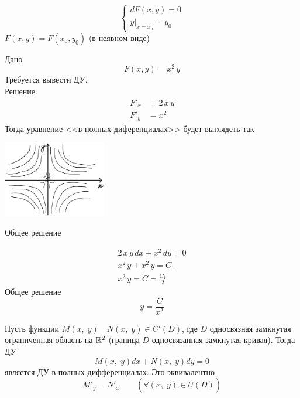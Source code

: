 \begin{Note}
    \[
        \begin{cases}
            dF(x,y)=0\\
            y|_{x=x_0}=y_0
        \end{cases}
    \]
    $F(x,y)=F(x_0,y_0)$ (в неявном виде)\\
\end{Note}

\begin{Example}
    Дано
    \[
        F(x,y)=x^2\,y 
    \]
    Требуется вывести ДУ.\\
    Решение.
    \begin{align*}
        F'_x &=2\,x\,y\\
        F'_y &= x^2
    \end{align*}
    Тогда уравнение <<в полных диференциалах>> будет выглядеть так
    \begin{floatingfigure}[l]{50mm}
        \noindent
        \hfil
        \includegraphics[width=45mm]{2_5_1.png}
        \caption{Общее решение}
        \hfil
    \end{floatingfigure}
    \begin{gather*}
        2\,x\,y\,dx+x^2\,dy = 0\\
        x^2\,y + x^2\,y = C_1\\
        x^2\,y = C = \frac{C_1}{2}
    \end{gather*}
    Общее решение
    \[
        y=\frac{C}{x^2}
    \]
\end{Example}

\begin{Th}
    Пусть функции $M(x,\; y) \quad N(x,\; y) \in C'(D)$, где $D$ односвязная замкнутая ограниченная область на $\mathbb{R}^2$ (граница $D$ односвязанная замкнутая кривая). Тогда ДУ 
    \[
        M(x,\; y)dx + N(x,\; y)dy = 0
    \] 
    является ДУ в полных дифференциалах. Это эквивалентно 
    \[
        M'_y = N'_x \qquad (\forall(x,\; y) \in \mathring{U}(D))
    \]
\end{Th}

